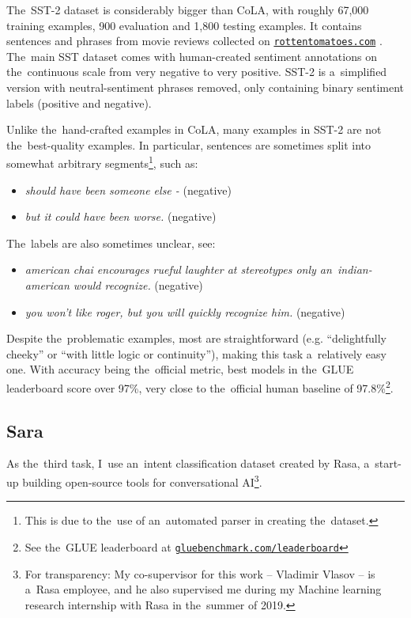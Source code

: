 \documentclass[bsc,frontabs,singlespacing,parskip,deptreport]{infthesis}
\newcommand\rurl[1]{%
  \href{https://#1}{\nolinkurl{#1}}%
}
\begin{document}
{{{      The~SST-2 dataset \citep{SST-paper} is considerably bigger than CoLA, with roughly 67,000 training examples, 900 evaluation and 1,800 testing examples. It contains sentences and phrases from movie reviews collected on \rurl{rottentomatoes.com}. The~main SST dataset comes with human-created sentiment annotations on the~continuous scale from very negative to very positive. SST-2 is a~simplified version with neutral-sentiment phrases removed, only containing binary sentiment labels (positive and negative).

      Unlike the~hand-crafted examples in CoLA, many examples in SST-2 are not the~best-quality examples. In particular, sentences are sometimes split into somewhat arbitrary segments\footnote{This is due to the~use of an~automated parser in creating the~dataset.}, such as:
      \begin{itemize}
        \item \textit{should have been someone else - } (negative)
        \item \textit{but it could have been worse.} (negative)
      \end{itemize}
      
      The~labels are also sometimes unclear, see:
      \begin{itemize}
        \item \textit{american chai encourages rueful laughter at stereotypes only an~indian-american would recognize.} (negative)
        \item \textit{you won't like roger, but you will quickly recognize him.} (negative)
      \end{itemize}

      Despite the~problematic examples, most are straightforward (e.g. ``delightfully cheeky'' or ``with little logic or continuity''), making this task a~relatively easy one. With accuracy being the~official metric, best models in the~GLUE leaderboard score over 97\%, very close to the~official human baseline of 97.8\%\footnote{See the~GLUE leaderboard at \rurl{gluebenchmark.com/leaderboard}}.
    }

    \subsection{Sara}{
      \label{sec:datasets-Sara}

      As the~third task, I~use an~intent classification dataset created by Rasa, a~start-up building open-source tools for conversational AI\footnote{For transparency: My co-supervisor for this work -- Vladimir Vlasov -- is a~Rasa employee, and he also supervised me during my Machine learning research internship with Rasa in the~summer of 2019.}.

}}}
\end{document}
